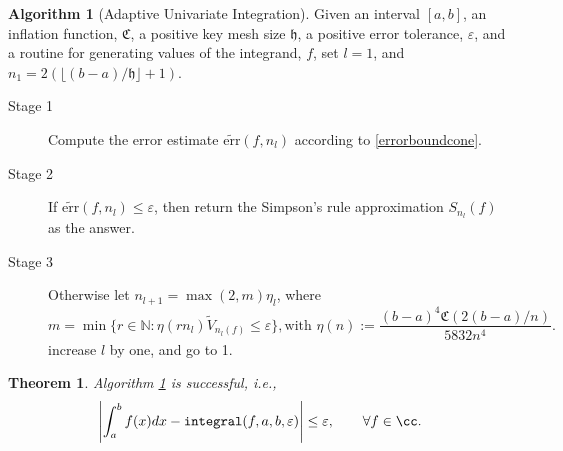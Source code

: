 \documentclass{iitthesis}
\DeclareMathOperator{\Var}{Var}
\newtheorem{theorem}{Theorem}
\theoremstyle{definition}
\newtheorem{algo}{Algorithm}
\theoremstyle{remark}
\begin{document}
\begin{algo}[Adaptive Univariate Integration] \label{multistageintegalgosimpson}
Given an interval $[a,b]$, an inflation function, $\mathfrak{C}$, a positive key mesh size $\mathfrak{h}$, a positive error tolerance, $\varepsilon$, and a routine for generating values of the integrand, $f$, set $l=1$, and
$n_1=2(\lfloor (b-a)/\mathfrak{h}\rfloor+1)$.%
\begin{description}
\item[Stage 1] %
Compute the error estimate $\widetilde{\text{err}}(f,n_l)$ according to \eqref{errorboundcone}.

\item[Stage 2] %
If $\widetilde{\text{err}}(f,n_l)\le\varepsilon$, then return the Simpson's rule approximation $S_{n_l}(f)$ as the answer.

\item[Stage 3] %
Otherwise let $n_{l+1}=\max(2,m)\eta_{l}$, where
$$m=\min\{r\in\mathbb{N}:\eta(rn_l)\widetilde{V}_{n_{l}(f)}\le\varepsilon\}, \text{with } \eta(n):=\frac{(b-a)^4\mathfrak{C}(2(b-a)/n)}{5832n^4}.$$
increase $l$ by one, and go to 1.
\end{description}
\end{algo}

\begin{theorem}\label{thmSimpson}
    Algorithm \ref{multistageintegalgosimpson} is successful, i.e.,
    \begin{equation*}
      \left|\int_{a}^{b}f(x)dx-\texttt{integral}(f,a,b,\varepsilon)\right|\le\varepsilon, \qquad \forall f\in \cc.
    \end{equation*}
\end{theorem}
\end{document}
